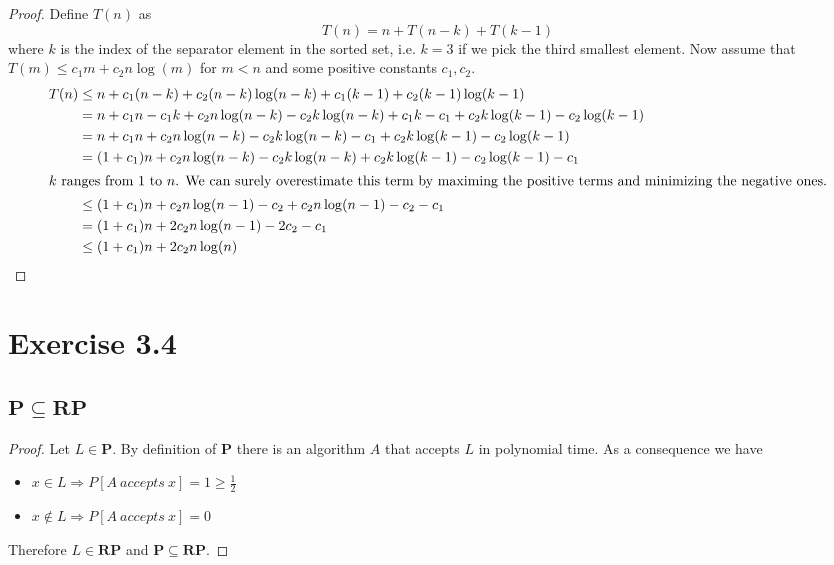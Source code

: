 \documentclass[10pt,a4paper]{article}
\begin{document}
\begin{proof}
  Define $T(n)$ as
  \begin{equation*}
    T(n) = n + T(n - k) + T(k - 1)
  \end{equation*}
  where $k$ is the index of the separator element in the sorted set, i.e. $k = 3$ if we pick the third smallest element.
  Now assume that $T(m) \le c_{1}m + c_{2}n\log(m)$ for $m < n$ and some positive constants $c_{1}, c_{2}$.
  \begin{align*}
    T(n) & \leq n + c_{1}(n - k) + c_{2}(n - k)\log(n - k) + c_{1}(k - 1) + c_{2}(k - 1)\log(k - 1)\\
         & = n + c_{1}n - c_{1}k + c_{2}n\log(n - k) - c_{2}k\log(n - k) + c_{1}k - c_{1} + c_{2}k\log(k - 1) - c_{2}\log(k - 1)\\
         & = n + c_{1}n + c_{2}n\log(n - k) - c_{2}k\log(n - k) - c_{1} + c_{2}k\log(k - 1) - c_{2}\log(k - 1)\\
         & = (1 + c_{1})n + c_{2}n\log(n - k) - c_{2}k\log(n - k) + c_{2}k\log(k - 1) - c_{2}\log(k - 1) - c_{1}\\
    \intertext{$k$ ranges from $1$ to $n$. We can surely overestimate this term by maximing the positive terms and minimizing the negative ones.}
         & \le (1 + c_{1})n + c_{2}n\log(n - 1) - c_{2} + c_{2}n\log(n - 1) - c_{2} - c_{1}\\
         & = (1 + c_{1})n + 2c_{2}n\log(n - 1) - 2c_{2} - c_{1}\\
         & \le (1 + c_{1})n + 2c_{2}n\log(n)
  \end{align*}
\end{proof}

\section*{Exercise 3.4}

\subsection*{$\mathbf{P \subseteq RP}$}

\begin{proof}
  Let $L \in \mathbf{P}$.
  By definition of $\mathbf{P}$ there is an algorithm $A$ that accepts $L$ in polynomial time.
  As a consequence we have
  \begin{itemize}
  \item $x \in L \Rightarrow P[A\ accepts\ x] = 1 \ge \frac{1}{2}$
  \item $x \notin L \Rightarrow P[A\ accepts\ x] = 0$
  \end{itemize}
  Therefore $L \in \mathbf{RP}$ and $\mathbf{P \subseteq RP}$.
\end{proof}
\end{document}
